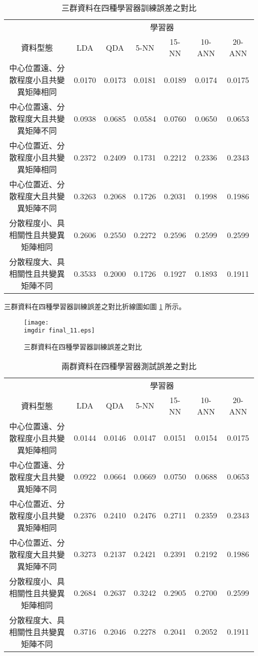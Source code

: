 \bigskip
\begin{table}[H] 
\centering
\caption{三群資料在四種學習器訓練誤差之對比}\label{tb:final_1}
\tabcolsep=2pt
\begin{tabular}{ccccccc} 
\toprule
& \multicolumn{6}{c}{學習器}\\
\cmidrule(l){2-7}
資料型態 & LDA & QDA & 5-NN & 15-NN & 10-ANN & 20-ANN\\[3pt]
\midrule
中心位置遠、分散程度小且共變異矩陣相同 & \cellcolor{red!25}0.0170 & 0.0173 & 0.0181 & 0.0189 & 0.0174 & 0.0175\\[3pt]
中心位置遠、分散程度大且共變異矩陣不同 & 0.0938 & 0.0685 & \cellcolor{red!25}0.0584 & 0.0760 & 0.0650 & 0.0653\\[3pt]
中心位置近、分散程度小且共變異矩陣相同 & 0.2372 & 0.2409 & \cellcolor{red!25}0.1731 & 0.2212 & 0.2336 & 0.2343\\[3pt]
中心位置近、分散程度大且共變異矩陣不同 & 0.3263 & 0.2068 & \cellcolor{red!25}0.1726 & 0.2031 & 0.1998 & 0.1986\\[3pt]
分散程度小、具相關性且共變異矩陣相同 & 0.2606 &  0.2550 & \cellcolor{red!25}0.2272 & 0.2596 & 0.2599 & 0.2599\\ [3pt]
分散程度大、具相關性且共變異矩陣不同 & 0.3533 &  0.2000 & \cellcolor{red!25}0.1726 & 0.1927 & 0.1893 & 0.1911\\ 
\bottomrule
\end{tabular}
\end{table}
三群資料在四種學習器訓練誤差之對比折線圖如圖 \ref{fig:final_11} 所示。
\begin{figure}[H]
    \centering
        \texttt{[image: \\imgdir final\_11.eps]}
    \caption{三群資料在四種學習器訓練誤差之對比}
    \label{fig:final_11}
\end{figure}
\bigskip
\begin{table}[H] 
\centering
\caption{兩群資料在四種學習器測試誤差之對比}\label{tb:final_2}
\tabcolsep=2pt
\begin{tabular}{ccccccc} 
\toprule
& \multicolumn{6}{c}{學習器}\\
\cmidrule(l){2-7}
資料型態 & LDA & QDA & 5-NN & 15-NN & 10-ANN & 20-ANN\\[3pt]
\midrule
中心位置遠、分散程度小且共變異矩陣相同 & \cellcolor{red!25}0.0144 & 0.0146 & 0.0147 & 0.0151 & 0.0154 & 0.0175\\[3pt]
中心位置遠、分散程度大且共變異矩陣不同 & 0.0922 & 0.0664 & 0.0669 & 0.0750 & 0.0688 & \cellcolor{red!25}0.0653\\[3pt]
中心位置近、分散程度小且共變異矩陣相同 & 0.2376 & 0.2410 & 0.2476 & 0.2711 & 0.2359 & \cellcolor{red!25}0.2343\\[3pt]
中心位置近、分散程度大且共變異矩陣不同 & 0.3273 & 0.2137 & 0.2421 & 0.2391 & 0.2192 & \cellcolor{red!25}0.1986\\[3pt]
分散程度小、具相關性且共變異矩陣相同 & 0.2684 &  0.2637 & 0.3242 & 0.2905 & 0.2700 & \cellcolor{red!25}0.2599\\ [3pt]
分散程度大、具相關性且共變異矩陣不同 & 0.3716 &  0.2046 & 0.2278 & 0.2041 & 0.2052 & \cellcolor{red!25}0.1911\\ 
\bottomrule
\end{tabular}
\end{table}
